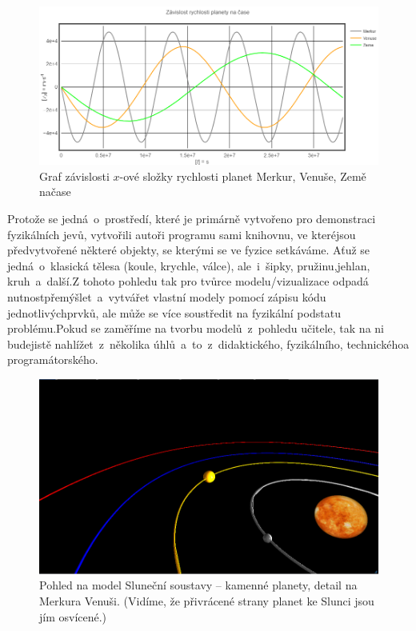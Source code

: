 \documentclass[FM,BP]{tulthesis}
\begin{document}
\begin{figure}[ht]
\centering
\includegraphics[width=\textwidth]{img1.png}
\caption{Graf závislosti $x$-ové složky rychlosti planet Merkur, Venuše, Země načase}
\label{obr1}
\end{figure}
Protože se jedná~o~prostředí, které je primárně vytvořeno pro demonstraci fyzikálních jevů, vytvořili autoři programu sami knihovnu, ve kteréjsou předvytvořené některé objekty, se kterými se ve fyzice setkáváme. Aťuž se jedná~o~klasická tělesa (koule, krychle, válce), ale~i~šipky, pružinu,jehlan, kruh~a~další.Z tohoto pohledu tak pro tvůrce modelu/vizualizace odpadá nutnostpřemýšlet~a~vytvářet vlastní modely pomocí zápisu kódu jednotlivýchprvků, ale může se více soustředit na fyzikální podstatu problému.Pokud se zaměříme na tvorbu modelů~z~pohledu učitele, tak na ni budejistě nahlížet~z~několika úhlů~a~to~z~didaktického, fyzikálního, technickéhoa programátorského.
\begin{figure}[ht]
\centering
\includegraphics[width=\textwidth]{img2.png}
\caption{Pohled na model Sluneční soustavy – kamenné planety, detail na Merkura Venuši. (Vidíme, že přivrácené strany planet ke Slunci jsou jím osvícené.)}
\label{obr2}
\end{figure}
\end{document}
